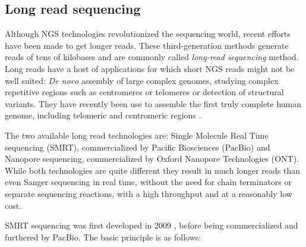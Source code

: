 \documentclass[
  11pt,
  twoside,
  BCOR=10mm,
  listof=totoc]{scrbook}
\begin{document}
\hypertarget{long-read-sequencing}{%
\subsection{Long read sequencing}\label{long-read-sequencing}}

Although NGS technologies revolutionized the sequencing world, recent efforts have been made to get longer reads. These third-generation methods generate reads of tens of kilobases and are commonly called \emph{long-read sequencing} method. Long reads have a host of applications \autocite{pollardLongReadsTheir2018} for which short NGS reads might not be well suited: \emph{De novo} assembly of large complex genomes, studying complex repetitive regions such as centromeres or telomeres or detection of structural variants. They have recently been use to assemble the first truly complete human genome, including telomeric and centromeric regions \autocite{nurk2022}.

The two available long read technologies are: Single Molecule Real Time sequencing (SMRT), commercialized by Pacific Biosciences (PacBio) and Nanopore sequencing, commercialized by Oxford Nanopore Technologies (ONT). While both technologies are quite different they result in much longer reads than even Sanger sequencing in real time, without the need for chain terminators or separate sequencing reactions, with a high throughput and at a reasonably low cost.

SMRT sequencing was first developed in 2009 \autocite{eidRealTimeDNASequencing2009}, before being commercialized and furthered by PacBio. The basic principle is as follows:
\end{document}
